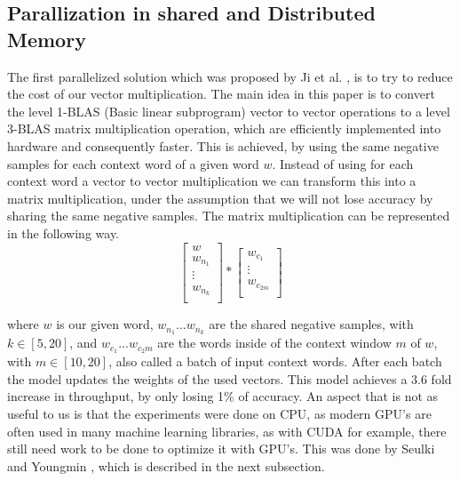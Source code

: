 \subsection{Parallization in shared and Distributed Memory}
The first parallelized solution which was proposed by Ji et al. \cite{intel}, is to try to reduce the cost of our vector multiplication. The main idea in this paper is to convert the level 1-BLAS (Basic linear subprogram) vector to vector operations to a level 3-BLAS matrix multiplication operation, which are efficiently implemented into hardware and consequently faster. This is achieved, by using the same negative samples for each context word of a given word $w$. Instead of using for each context word a vector to vector multiplication we can transform this into a matrix multiplication, under the assumption that we will not lose accuracy by sharing the same negative samples. The matrix multiplication can be represented in the following way.
\[
\begin{bmatrix}
w \\
w_{n_1} \\
\vdots \\
w_{n_k}\\
\end{bmatrix}
*
\begin{bmatrix}
w_{c_1}\\
\vdots\\
w_{c_{2m}}\\
\end{bmatrix}
\]

where $w$ is our given word, $w_{n_1}...w_{n_k}$ are the shared negative samples, with $k \in [5,20]$, and $w_{c_1}...w_{c_2m}$ are the words inside of the context window $m$ of $w$, with $m \in [10,20]$, also called a batch of input context words. After each batch the model updates the weights of the used vectors.
This model achieves a 3.6 fold increase in throughput, by only losing 1\% of accuracy. An aspect that is not as useful to us is that the experiments were done on CPU, as modern GPU's are often used in many machine learning libraries, as with CUDA for example, there still need work to be done to optimize it with GPU's. This was done by Seulki and Youngmin \cite{gpu}, which is described in the next subsection.

